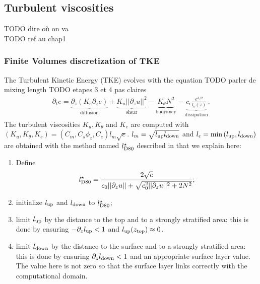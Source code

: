 \subsection{Turbulent viscosities}
\label{sec:ND_StratifiedCase_turbulentVisc}
{\color{red} TODO dire où on va}\\
{\color{red} TODO ref au chap1}
\subsubsection{Finite Volumes discretization of TKE}
The Turbulent Kinetic Energy (TKE) evolves with the equation
{\color{red} TODO parler de mixing length}
{\color{red} TODO etapes 3 et 4 pas claires}
\begin{equation}
\label{eq:ND_StratifiedCase_TKE}
    \begin{aligned}
    \partial_t e =
    \underbrace{\partial_z \left(K_e
    \partial_z e\right)}_{\text{diffusion}}
    + \underbrace{K_u ||\partial_z u||^2}_{\text{shear}} 
    - \underbrace{K_{\theta} N^2 }_{\text{buoyancy}}
    - \underbrace{c_{\epsilon}
    \frac{e^{3/2}}{l_{\epsilon}(z)}}_{\text{dissipation}}.
    \end{aligned}
\end{equation}
The turbulent viscosities $K_u, K_{\theta}$ and $K_e$ are computed
with $(K_u, K_\theta, K_e) = (C_m , C_s \phi_z, C_e)l_m \sqrt{e}$.
$l_m = \sqrt{l_{\rm up} l_{\rm down}}$ and
$l_\epsilon = \min{(l_{\rm up}, l_{\rm down})}$
are obtained with the method named $l^\star_{\rm D80}$ described in
\cite{lemarie_simplified_2021} that we explain here:
\begin{enumerate}
	\item Define
		\begin{equation}
			\label{eq:ND_StratifiedCase_lD80}
			l^\star_{\rm D80} = \frac{2\sqrt{e}}
			{c_0 ||\partial_z u|| + \sqrt{
				c_0^2 ||\partial_z u||^2 + 2 N^2
			}};
		\end{equation}
	\item initialize $l_{\rm up}$ and $l_{\rm down}$ to
		$l^\star_{\rm D80}$;
	\item limit $l_{\rm up}$ by the distance to the top and to
		a strongly stratified area: this is done by
		ensuring $-\partial_z l_{\rm up} < 1$ and
		$l_{\rm up}(z_{\rm top}) \approx 0$.
	\item limit $l_{\rm down}$ by the distance to the surface
		and to a strongly stratified area: this is done by
		ensuring $\partial_z l_{\rm down} < 1$ and
		an appropriate surface layer value.
		The value here is not zero so that the surface layer
		links correctly with the computational domain.
\end{enumerate}
